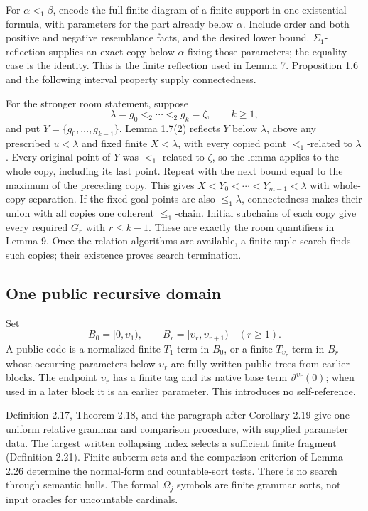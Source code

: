 \documentclass[11pt]{article}
\newcommand{\up}{\upsilon}
\begin{document}
For $\alpha<_1\beta$, encode the full finite diagram of a finite
support in one existential formula, with parameters for the part
already below $\alpha$. Include order and both positive and
negative resemblance facts, and the desired lower bound.
$\Sigma_1$-reflection supplies an exact copy below $\alpha$
fixing those parameters; the equality case is the identity.
This is the finite reflection used in Lemma 7. Proposition 1.6
and the following interval property supply connectedness.

For the stronger room statement, suppose
\[
 \lambda=g_0<_2\cdots<_2g_k=\zeta,\qquad k\ge1,
\]
and put $Y=\{g_0,\ldots,g_{k-1}\}$. Lemma 1.7(2) reflects $Y$
below $\lambda$, above any prescribed $u<\lambda$ and fixed finite
$X<\lambda$, with every copied point $<_1$-related to $\lambda$.
Every original point of $Y$ was $<_1$-related to $\zeta$, so the
lemma applies to the whole copy, including its last point. Repeat
with the next bound equal to the maximum of the preceding copy.
This gives $X<Y_0<\cdots<Y_{m-1}<\lambda$ with whole-copy
separation. If the fixed goal points are also $\le_1\lambda$,
connectedness makes their union with all copies one coherent
$\le_1$-chain. Initial subchains of each copy give every required
$G_r$ with $r\le k-1$. These are exactly the room quantifiers in
Lemma 9. Once the relation algorithms are available, a finite tuple
search finds such copies; their existence proves search termination.

\subsection{One public recursive domain}

Set
\[
 B_0=[0,\up_1),\qquad B_r=[\up_r,\up_{r+1})\quad(r\ge1).
\]
A public code is a normalized finite $T_1$ term in $B_0$, or a
finite $T_{\up_r}$ term in $B_r$ whose occurring parameters below
$\up_r$ are fully written public trees from earlier blocks. The
endpoint $\up_r$ has a finite tag and its native base term
$\vartheta^{\up_r}(0)$; when used in a later block it is an earlier
parameter. This introduces no self-reference.

Definition 2.17, Theorem 2.18, and the paragraph after Corollary 2.19
give one uniform relative grammar and comparison procedure, with
supplied parameter data. The largest written collapsing index
selects a sufficient finite fragment (Definition 2.21). Finite
subterm sets and the comparison criterion of Lemma 2.26 determine
the normal-form and countable-sort tests. There is no search
through semantic hulls. The formal $\Omega_j$ symbols are finite
grammar sorts, not input oracles for uncountable cardinals.
\end{document}
